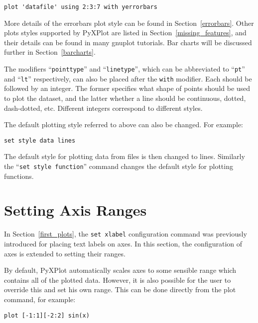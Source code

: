 \documentclass[a4paper,onecolumn,11pt]{book}
\begin{document}
\begin{verbatim}
plot 'datafile' using 2:3:7 with yerrorbars
\end{verbatim}

More details of the errorbars plot style can be found in
Section~\ref{errorbars}. Other plots styles supported by PyXPlot are listed in
Section~\ref{missing_features}, and their details can be found in many gnuplot
tutorials. Bar charts will be discussed further in Section~\ref{barcharts}.

The modifiers ``\texttt{pointtype}'' and ``\texttt{linetype}''\label{pointtype_modifier}, which can be
abbreviated to ``\texttt{pt}'' and ``\texttt{lt}'' respectively, can also be
placed after the \texttt{with} modifier. Each should be followed by an integer.
The former specifies what shape of points should be used to plot the dataset,
and the latter whether a line should be continuous, dotted, dash-dotted, etc.
Different integers correspond to different styles.

The default plotting style referred to above can also be changed.  For example:

\begin{verbatim}
set style data lines
\end{verbatim}

\noindent The default style for plotting data from files is then changed to
lines.  Similarly the ``{\tt set style function}'' command changes the default style for
plotting functions.

\section{Setting Axis Ranges}

In Section~\ref{first_plots}, the \texttt{set xlabel} configuration command was
previously introduced for placing text labels on axes. In this section, the
configuration of axes is extended to setting their ranges.

By default, PyXPlot automatically scales axes to some sensible range which
contains all of the plotted data. However, it is also possible for the user to
override this and set his own range. This can be
done directly from the plot command, for example:

\begin{verbatim}
plot [-1:1][-2:2] sin(x)
\end{verbatim}
\label{plot_ranges}
\end{document}
